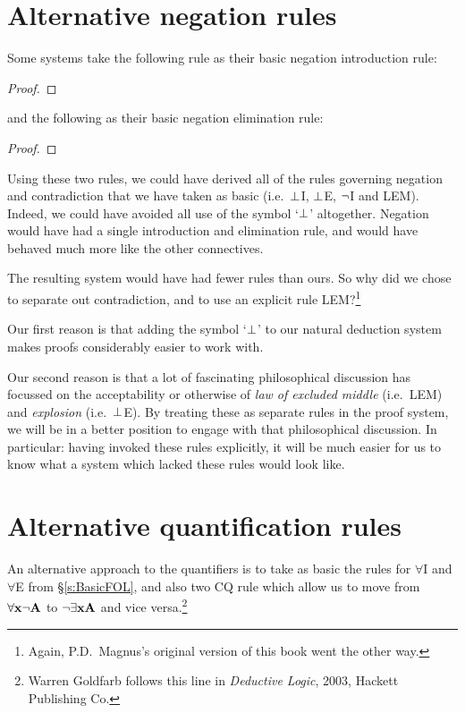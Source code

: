 \section{Alternative negation rules}
Some systems take the following rule as their basic negation introduction rule:
\begin{proof}
	\open
	\close
\end{proof}
and the following as their basic negation elimination rule:
\begin{proof}
	\open
	\close
\end{proof}
Using these two rules, we could have derived all of the rules governing negation and contradiction that we have taken as basic (i.e.\ $\bot$I, $\bot$E, $\neg$I and LEM). Indeed, we could have avoided all use of the symbol `$\bot$' altogether. Negation would have had a single introduction and elimination rule, and would have behaved much more like the other connectives.

The resulting system would have had fewer rules than ours. So why did we chose to separate out contradiction, and to use an explicit rule LEM?\footnote{Again, P.D.\ Magnus's original version of this book went the other way.}

Our first reason is that adding the symbol `$\bot$' to our natural deduction system makes proofs considerably easier to work with.

Our second reason is that a lot of fascinating philosophical discussion has focussed on the acceptability or otherwise of \emph{law of excluded middle} (i.e.\ LEM) and \emph{explosion} (i.e.\ $\bot$E). By treating these as separate rules in the proof system, we will be  in a better position to engage with that philosophical discussion. In particular: having invoked these rules explicitly, it will be much easier for us to know what a system which lacked these rules would look like.



\section{Alternative quantification rules}
An alternative approach to the quantifiers is to take as basic the rules for $\forall$I and $\forall$E from \S\ref{s:BasicFOL}, and also two CQ rule which allow us to move from $\forall \mathbf{x} \neg \mathbf{A}$ to $\neg \exists \mathbf{x} \mathbf{A}$ and vice versa.\footnote{Warren Goldfarb follows this line in \emph{Deductive Logic}, 2003, Hackett Publishing Co.}  

